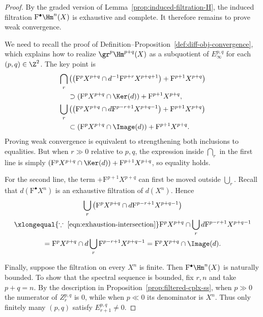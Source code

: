 \begin{proof}
	By the graded version of Lemma~\ref{prop:induced-filtration-H}, the induced
	filtration $\mathrm{F}^\bullet\Hm^n(X)$ is exhaustive and complete. It
	therefore remains to prove weak convergence.

	We need to recall the proof of
	Definition--Proposition~\ref{def:diff-obj-convergence}, which explains how
	to realize $\gr^p\Hm^{p+q}(X)$ as a subquotient of $E_\infty^{p,q}$ for
	each $(p,q)\in\Z^2$. The key point is
	\begin{equation*}\begin{split}
		\bigcap_r&\left(\left(\mathrm{F}^pX^{p+q}\cap
		d^{-1}\mathrm{F}^{p+r}X^{p+q+1}\right)+\mathrm{F}^{p+1}X^{p+q}\right)
		\\
		&\supset(\mathrm{F}^pX^{p+q}\cap\Ker(d))+\mathrm{F}^{p+1}X^{p+q},\\
		\bigcup_r&\left(\left(\mathrm{F}^pX^{p+q}\cap
		d\mathrm{F}^{p-r+1}X^{p+q-1}\right)+\mathrm{F}^{p+1}X^{p+q}\right)
		\\
		&\subset(\mathrm{F}^pX^{p+q}\cap\Image(d))+\mathrm{F}^{p+1}X^{p+q}.
	\end{split}\end{equation*}
	Proving weak convergence is equivalent to strengthening both inclusions to
	equalities. But when $r\gg0$ relative to $p,q$, the expression inside
	$\bigcap_r$ in the first line is simply
	$(\mathrm{F}^pX^{p+q}\cap\Ker(d))+\mathrm{F}^{p+1}X^{p+q}$, so equality
	holds.

	For the second line, the term $+\mathrm{F}^{p+1}X^{p+q}$ can first be
	moved outside $\bigcup_r$. Recall that $d(\mathrm{F}^\bullet X^n)$ is an
	exhaustive filtration of $d(X^n)$. Hence
	\begin{multline*}
		\bigcup_r\left(\mathrm{F}^pX^{p+q}\cap
		d\mathrm{F}^{p-r+1}X^{p+q-1}\right)\\
		\xlongequal{\because\;\text{\eqref{eqn:exhaustion-intersection}}}
		\mathrm{F}^pX^{p+q}\cap\bigcup_r
		d\mathrm{F}^{p-r+1}X^{p+q-1}\\
		=\mathrm{F}^pX^{p+q}\cap d\bigcup_r
		\mathrm{F}^{p-r+1}X^{p+q-1}
		=\mathrm{F}^pX^{p+q}\cap\Image(d).
	\end{multline*}

	Finally, suppose the filtration on every $X^n$ is finite. Then
	$\mathrm{F}^\bullet\Hm^n(X)$ is naturally bounded. To show that the
	spectral sequence is bounded, fix $r,n$ and take $p+q=n$. By the
	description in Proposition~\ref{prop:filtered-cplx-ss}, when $p\gg0$ the
	numerator of $Z_r^{p,q}$ is $0$, while when $p\ll0$ its denominator is
	$X^n$. Thus only finitely many $(p,q)$ satisfy $E_{r+1}^{p,q}\neq0$.
\end{proof}

